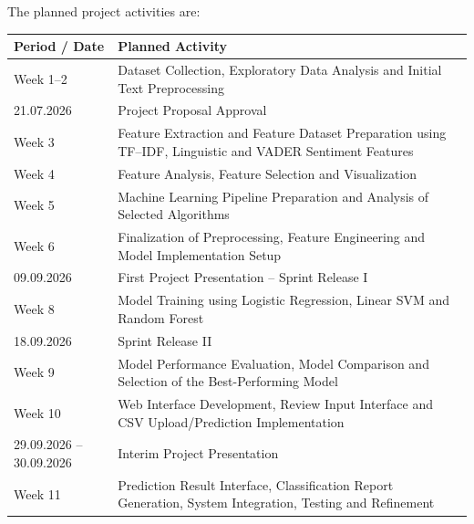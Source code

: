 \documentclass[12pt,a4paper]{report}
\begin{document}
The planned project activities are:

\begin{table}[H]
\centering
\renewcommand{\arraystretch}{1.5}
\setlength{\tabcolsep}{8pt}

\begin{tabularx}{\textwidth}{|>{\raggedright\arraybackslash}p{3.5cm}|X|}
\hline
\textbf{Period / Date} & \textbf{Planned Activity} \\
\hline

Week 1--2 &
Dataset Collection, Exploratory Data Analysis and Initial Text Preprocessing \\
\hline

21.07.2026 &
Project Proposal Approval \\
\hline

Week 3 &
Feature Extraction and Feature Dataset Preparation using TF--IDF, Linguistic and VADER Sentiment Features \\
\hline

Week 4 &
Feature Analysis, Feature Selection and Visualization \\
\hline

Week 5 &
Machine Learning Pipeline Preparation and Analysis of Selected Algorithms \\
\hline

Week 6 &
Finalization of Preprocessing, Feature Engineering and Model Implementation Setup \\
\hline

09.09.2026 &
First Project Presentation -- Sprint Release I \\
\hline

Week 8 &
Model Training using Logistic Regression, Linear SVM and Random Forest \\
\hline

18.09.2026 &
Sprint Release II \\
\hline

Week 9 &
Model Performance Evaluation, Model Comparison and Selection of the Best-Performing Model \\
\hline

Week 10 &
Web Interface Development, Review Input Interface and CSV Upload/Prediction Implementation \\
\hline

29.09.2026 -- 30.09.2026 &
Interim Project Presentation \\
\hline

Week 11 &
Prediction Result Interface, Classification Report Generation, System Integration, Testing and Refinement \\
\hline


\end{tabularx}
\end{table}
\end{document}
